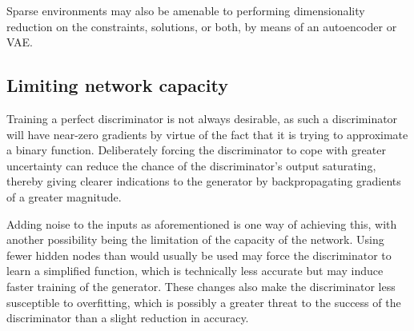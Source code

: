 \documentclass[../../main.tex]{subfiles}
\begin{document}
Sparse environments may also be amenable to performing dimensionality reduction on the constraints, solutions, or both, by means of an autoencoder or VAE.

\subsection{Limiting network capacity}

Training a perfect discriminator is not always desirable, as such a discriminator will have near-zero gradients by virtue of the fact that it is trying to approximate a binary function.
Deliberately forcing the discriminator to cope with greater uncertainty can reduce the chance of the discriminator's output saturating, thereby giving clearer indications to the generator by backpropagating gradients of a greater magnitude.

Adding noise to the inputs as aforementioned is one way of achieving this, with another possibility being the limitation of the capacity of the network.
Using fewer hidden nodes than would usually be used may force the discriminator to learn a simplified function, which is technically less accurate but may induce faster training of the generator.
These changes also make the discriminator less susceptible to overfitting, which is possibly a greater threat to the success of the discriminator than a slight reduction in accuracy.
\end{document}
